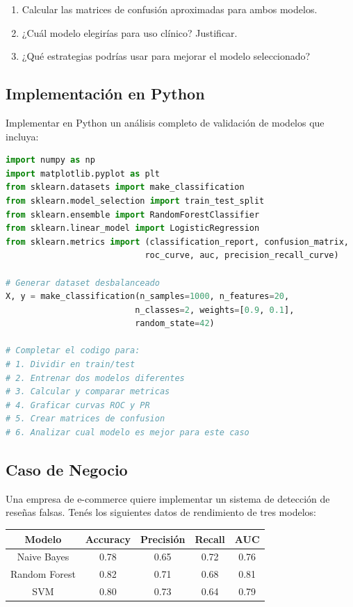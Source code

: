 \documentclass[12pt]{article}
\begin{document}
\begin{enumerate}
    \item[a.] Calcular las matrices de confusión aproximadas para ambos modelos.
    \item[b.] ¿Cuál modelo elegirías para uso clínico? Justificar.
    \item[c.] ¿Qué estrategias podrías usar para mejorar el modelo seleccionado?
\end{enumerate}

\subsection{Implementación en Python}

Implementar en Python un análisis completo de validación de modelos que incluya:

\begin{lstlisting}[language=Python]
import numpy as np
import matplotlib.pyplot as plt
from sklearn.datasets import make_classification
from sklearn.model_selection import train_test_split
from sklearn.ensemble import RandomForestClassifier
from sklearn.linear_model import LogisticRegression
from sklearn.metrics import (classification_report, confusion_matrix, 
                            roc_curve, auc, precision_recall_curve)

# Generar dataset desbalanceado
X, y = make_classification(n_samples=1000, n_features=20, 
                          n_classes=2, weights=[0.9, 0.1], 
                          random_state=42)

# Completar el codigo para:
# 1. Dividir en train/test
# 2. Entrenar dos modelos diferentes
# 3. Calcular y comparar metricas
# 4. Graficar curvas ROC y PR
# 5. Crear matrices de confusion
# 6. Analizar cual modelo es mejor para este caso
\end{lstlisting}

\subsection{Caso de Negocio}

Una empresa de e-commerce quiere implementar un sistema de detección de reseñas falsas. Tenés los siguientes datos de rendimiento de tres modelos:

\begin{table}[H]
    \centering
    \begin{tabular}{|c|c|c|c|c|}
        \hline
        \textbf{Modelo} & \textbf{Accuracy} & \textbf{Precisión} & \textbf{Recall} & \textbf{AUC} \\
        \hline
        Naive Bayes & 0.78 & 0.65 & 0.72 & 0.76 \\
        \hline
        Random Forest & 0.82 & 0.71 & 0.68 & 0.81 \\
        \hline
        SVM & 0.80 & 0.73 & 0.64 & 0.79 \\
        \hline
    \end{tabular}
\end{table}
\end{document}

